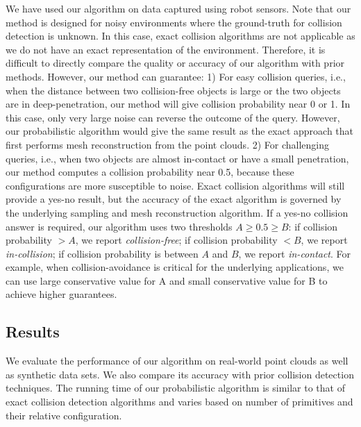 We have used our algorithm on data captured using robot sensors. Note that our method is designed for noisy environments where the ground-truth for collision detection is unknown. In this case, exact collision algorithms are not applicable as we do not have an exact representation of the environment.
Therefore, it is difficult to directly compare the quality or accuracy of our algorithm with prior methods. However, our method can guarantee: 1) For easy collision queries, i.e., when the distance between two collision-free objects is large or the two objects are in deep-penetration, our method will give collision probability near 0 or 1. In this case, only very large noise can reverse the outcome of the query. However, our probabilistic algorithm would give the same result as the exact approach that first performs mesh reconstruction from the point clouds. 2) For challenging queries, i.e., when two objects are almost in-contact or have a small penetration, our method computes a collision probability near 0.5, because these configurations are more susceptible to noise. Exact collision algorithms will still provide a yes-no result, but the accuracy of the exact algorithm is governed by the underlying sampling and mesh reconstruction algorithm. If a yes-no collision answer is required, our algorithm uses two thresholds $A \geq 0.5 \geq B$: if collision probability $>A$, we report \emph{collision-free}; if collision probability $< B$, we report \emph{in-collision}; if collision probability is between $A$ and $B$, we report \emph{in-contact}. For example, when collision-avoidance is critical for the underlying applications, we can use large conservative value for A and small conservative value for B to achieve higher guarantees.

\subsection{Results}
We evaluate the performance of our algorithm on real-world point clouds as well as synthetic data sets. We also compare its accuracy with prior collision
detection techniques. The running time of our probabilistic algorithm is similar to that of exact collision detection algorithms and varies based on
number of primitives and their relative configuration.

